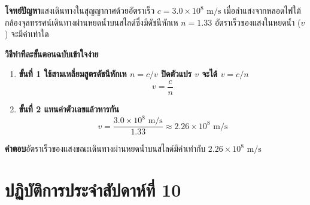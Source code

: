 \begin{worked}
\textbf{โจทย์ปัญหา}\quad แสงเดินทางในสุญญากาศด้วยอัตราเร็ว $c = 3.0 \times 10^8\text{ m/s}$ เมื่อลำแสงจากหลอดไฟใต้กล้องจุลทรรศน์เดินทางผ่านหยดน้ำบนสไลด์ซึ่งมีดัชนีหักเห $n = 1.33$ อัตราเร็วของแสงในหยดน้ำ ($v$) จะมีค่าเท่าใด

\textbf{วิธีทำทีละขั้นตอนฉบับเข้าใจง่าย}
\begin{enumerate}
    \item \textbf{ขั้นที่ 1 ใช้สามเหลี่ยมสูตรดัชนีหักเห $n = c / v$ ปิดตัวแปร $v$ จะได้ $v = c / n$}
    \[
        v = \frac{c}{n}
    \]
    \item \textbf{ขั้นที่ 2 แทนค่าตัวเลขแล้วหารกัน}
    \[
        v = \frac{3.0 \times 10^8\text{ m/s}}{1.33} \approx 2.26 \times 10^8\text{ m/s}
    \]
\end{enumerate}
\textbf{คำตอบ}\quad อัตราเร็วของแสงขณะเดินทางผ่านหยดน้ำบนสไลด์มีค่าเท่ากับ $2.26 \times 10^8\text{ m/s}$
\end{worked}

\section{ปฏิบัติการประจำสัปดาห์ที่ 10}

